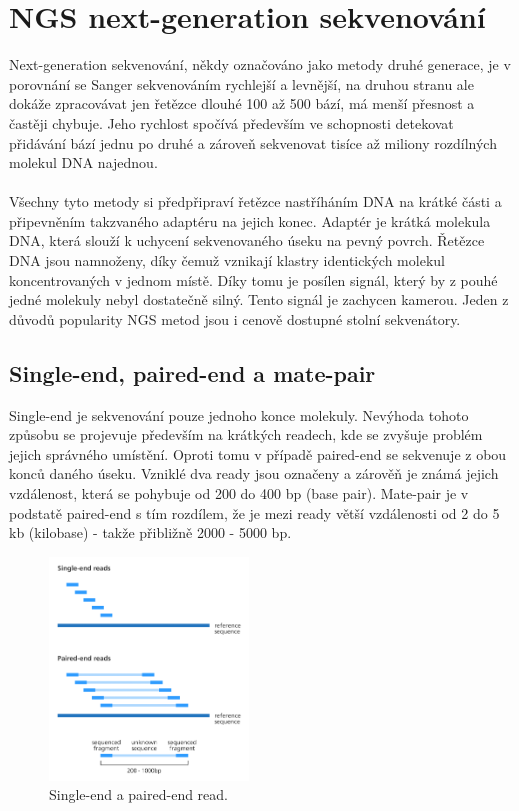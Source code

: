 \documentclass[czech,DP]{thesiskiv}
\numberwithin{equation}{section}
\begin{document}
\section{NGS next-generation sekvenování}
Next-generation sekvenování, někdy označováno jako metody druhé generace, je v porovnání se Sanger sekvenováním rychlejší a levnější, na druhou stranu ale dokáže zpracovávat jen řetězce dlouhé 100 až 500 bází, má menší přesnost a častěji chybuje. Jeho rychlost spočívá především ve schopnosti detekovat přidávání bází jednu po druhé a zároveň sekvenovat tisíce až miliony rozdílných molekul DNA najednou. 
\\
\\
Všechny tyto metody si předpřipraví řetězce nastříháním DNA na krátké části a připevněním takzvaného adaptéru na jejich konec. Adaptér je krátká molekula DNA, která slouží k uchycení sekvenovaného úseku na pevný povrch. Řetězce DNA jsou namnoženy, díky čemuž vznikají klastry identických molekul koncentrovaných v jednom místě. Díky tomu je posílen signál, který by z pouhé jedné molekuly nebyl dostatečně silný. Tento signál je zachycen kamerou. Jeden z důvodů popularity NGS metod jsou i cenově dostupné stolní sekvenátory.
 
\subsection{Single-end, paired-end a mate-pair}
Single-end je sekvenování pouze jednoho konce molekuly. Nevýhoda tohoto způsobu se projevuje především na krátkých readech, kde se zvyšuje problém jejich správného umístění. Oproti tomu v případě paired-end se sekvenuje z obou konců daného úseku. Vzniklé dva ready jsou označeny a zárověň je známá jejich vzdálenost, která se pohybuje od 200 do 400 bp (base pair). Mate-pair je v podstatě paired-end s tím rozdílem, že je mezi ready větší vzdálenosti od 2 do 5 kb (kilobase) - takže přibližně 2000 - 5000 bp. \cite{illumina}  

\begin{figure}[H]		
		\centering
		\includegraphics[width=200px]{./img/single_end_pair_end_reads_yourgenome.png}
		\caption{Single-end a paired-end read. \cite{your_genome} }
		\label{fig:single_end_paired_end}
\end{figure} 
 
\end{document}
